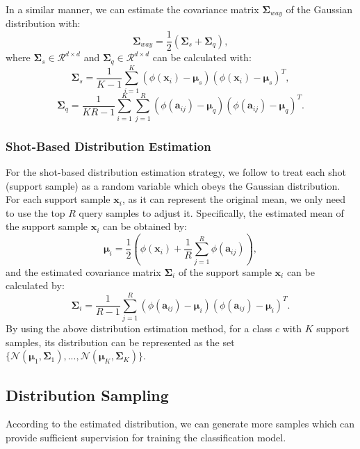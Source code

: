 \documentclass[letterpaper]{article} %
\begin{document}
In a similar manner, we can estimate the covariance matrix $\bm{\Sigma}_{way}$ of the Gaussian distribution with:
\begin{equation}
	\bm{\Sigma}_{way} = \frac{1}{2}(\bm{\Sigma}_{s}+\bm{\Sigma}_{q}),
\end{equation}
where $\bm{\Sigma}_{s} \in \mathcal{R}^{d \times d}$  and $\bm{\Sigma}_{q} \in \mathcal{R}^{d \times d}$ can be calculated with:
\begin{equation}
	\bm{\Sigma}_{s} = \frac{1}{K - 1} \sum_{i=1}^{K}(\phi(\bm x_i) - \boldsymbol{\mu}_s )(\phi(\bm x_i) - \boldsymbol{ \mu}_s )^T,
\end{equation}
\begin{equation}
	\bm{\Sigma}_{q} = \frac{1}{KR - 1} \sum_{i=1}^{K}\sum_{j=1}^{R}(\phi(\bm{a}_{ij}) - \boldsymbol{\mu}_q )(\phi(\bm{a}_{ij}) - \boldsymbol{ \mu}_q )^T.
\end{equation}

\subsubsection{Shot-Based Distribution Estimation} For the shot-based distribution estimation strategy, we follow \cite{freelunch} to treat each shot (support sample) as a random variable which obeys the Gaussian distribution. For each support sample $\bm x_i$, as it can represent the original mean, we only need to use the top $R$ query samples to adjust it. Specifically, the estimated mean of the support sample $\bm x_i$ can be obtained by:
\begin{equation}
	\bm{\mu}_i = \frac{1}{2}(\phi (\bm x_i)+\frac{1}{R}\sum_{j=1}^{R}\phi(\bm{a}_{ij})),
\end{equation}
and the estimated covariance matrix $\bm{\Sigma}_{i}$ of the support sample $\bm x_i$ can be calculated by:
\begin{equation}
	\bm{\Sigma}_i = \frac{1}{R-1} \sum_{j=1}^{R} (\phi(\bm{a}_{ij}) - \bm{\mu}_i)(\phi(\bm{a}_{ij}) - \bm{\mu}_i)^T.
\end{equation}
By using the above distribution estimation method, for a class $c$ with $K$ support samples, its distribution can be represented as the set $\{\mathcal{N}(\boldsymbol{\mu}_1, \bm{\Sigma}_1), ...,  \mathcal{N}(\boldsymbol{\mu}_K, \bm{\Sigma}_K)\}$.

\subsection{Distribution Sampling}
According to the estimated distribution, we can generate more samples which can provide sufficient supervision for training the classification model.
\end{document}
